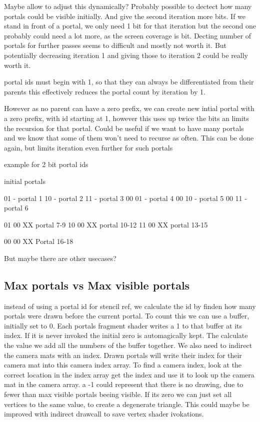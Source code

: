 Maybe allow to adjust this dynamically? Probably possible to dectect how many portals could be visible initially. And give the second iteration more bits. If we stand in front of a portal, we only need 1 bit for that iteration but the second one probably could need a lot more, as the screen coverage is bit.
Decting number of portals for further passes seems to difficult and mostly not worth it. But potentially decreasing iteration 1 and giving those to iteration 2 could be really worth it.


portal ids must begin with 1, so that they can always be differentiated from their parents
this effectively reduces the portal count by iteration by 1.

However as no parent can have a zero prefix, we can create new intial portal with a zero prefix, with id starting at 1, however this uses up twice the bits an limits the recursion for that portal. Could be useful if we want to have many portals and we know that some of them won't need to recurse as often.
This can be done again, but limits iteration even further for such portals

example for 2 bit portal ids

initial portals

01 - portal 1
10 - portal 2
11 - portal 3
00 01 - portal 4
00 10 - portal 5
00 11 - portal 6

01 00 XX portal 7-9
10 00 XX portal 10-12
11 00 XX portal 13-15

00 00 XX Portal 16-18

But  maybe there are other usecases?




\subsection{Max portals vs Max visible portals}
instead of using a portal id for stencil ref, we calculate the id by finden how many portals were drawn before the current portal.
To count this we can use a buffer, initially set to 0. Each portals fragment shader writes a 1 to that buffer at its index. If it is never invoked the initial zero is automagically kept. The calculate the value we add all the numbers of the buffer together.
We also need to indirect the camera mats with an index. Drawn portals will write their index for their camera mat into this camera index array.
To find a camera index, look at the correct location in the index array get the index and use it to look up the camera mat in the camera array. a -1 could represent that there is no drawing, due to fewer than max visible portals beeing visible. If its zero we can just set all vertices to the same value, to create a degenerate triangle.
This could maybe be improved with indirect drawcall to save vertex shader ivokations.

